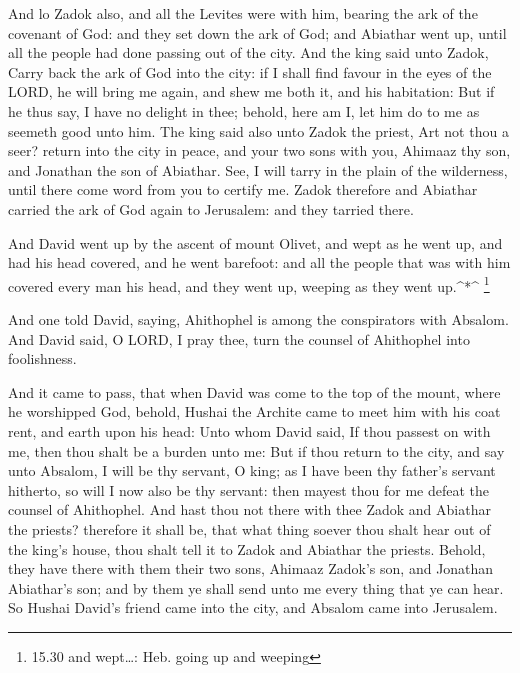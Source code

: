  And lo Zadok also, and all the Levites were with him,
bearing the ark of the covenant of God: and they set down the ark of
God; and Abiathar went up, until all the people had done passing out of
the city.  And the king said unto Zadok, Carry back the ark
of God into the city: if I shall find favour in the eyes of the LORD, he
will bring me again, and shew me both it, and his habitation:
 But if he thus say, I have no delight in thee; behold,
here am I, let him do to me as seemeth good unto him.  The
king said also unto Zadok the priest, Art not thou a seer? return into
the city in peace, and your two sons with you, Ahimaaz thy son, and
Jonathan the son of Abiathar.  See, I will tarry in the
plain of the wilderness, until there come word from you to certify me.
 Zadok therefore and Abiathar carried the ark of God again
to Jerusalem: and they tarried there.

 And David went up by the ascent of mount Olivet, and wept
as he went up, and had his head covered, and he went barefoot: and all
the people that was with him covered every man his head, and they went
up, weeping as they went up.\^{}*\^{} \footnote{15.30 and wept\ldots:
  Heb. going up and weeping}

 And one told David, saying, Ahithophel is among the
conspirators with Absalom. And David said, O LORD, I pray thee, turn the
counsel of Ahithophel into foolishness.

 And it came to pass, that when David was come to the top
of the mount, where he worshipped God, behold, Hushai the Archite came
to meet him with his coat rent, and earth upon his head: 
Unto whom David said, If thou passest on with me, then thou shalt be a
burden unto me:  But if thou return to the city, and say
unto Absalom, I will be thy servant, O king; as I have been thy father's
servant hitherto, so will I now also be thy servant: then mayest thou
for me defeat the counsel of Ahithophel.  And hast thou not
there with thee Zadok and Abiathar the priests? therefore it shall be,
that what thing soever thou shalt hear out of the king's house, thou
shalt tell it to Zadok and Abiathar the priests.  Behold,
they have there with them their two sons, Ahimaaz Zadok's son, and
Jonathan Abiathar's son; and by them ye shall send unto me every thing
that ye can hear.  So Hushai David's friend came into the
city, and Absalom came into Jerusalem.


